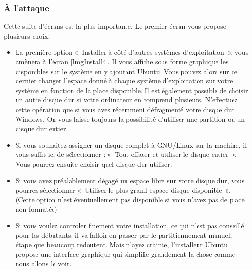 \subsubsection{À l'attaque}
Cette suite d'écrans est la plus importante. Le premier écran vous propose plusieurs choix:
\begin{itemize}
\item La première option «~Installer à côté d'autres systèmes d'exploitation~», vous amènera à l'écran \ref{ImgInstall4}. Il vous affiche sous forme graphique les  disponibles sur le système en y ajoutant Ubuntu. Vous pouvez alors sur ce dernier changer l'espace donné à chaque système d'exploitation sur votre système en fonction de la place disponible. Il est également possible de choisir un autre disque dur si votre ordinateur en comprend plusieurs. N'effectuez cette opération que si vous avez récemment défragmenté votre disque dur Windows. On vous laisse toujours la possibilité d'utiliser une partition ou un disque dur entier
\item Si vous souhaitez assigner un disque complet à GNU/Linux sur la machine, il vous suffit ici de sélectionner : «~Tout effacer et utiliser le disque entier~». Vous pourrez ensuite choisir quel disque dur utiliser.
\item Si vous avez préalablement dégagé un espace libre sur votre disque dur, vous pourrez sélectionner «~Utiliser le plus grand espace disque disponible~». (Cette option n'est éventuellement pas disponible si vous n'avez pas de place non formatée)
\item Si vous voulez controler finement votre installation, ce qui n'est pas conseillé pour les débutants, il va falloir en passer par le partitionnement manuel, étape que beaucoup redoutent. Mais n'ayez crainte, l'installeur Ubuntu propose une interface graphique qui simplifie grandement la chose comme nous allons le voir.
\end{itemize}\par
{}
